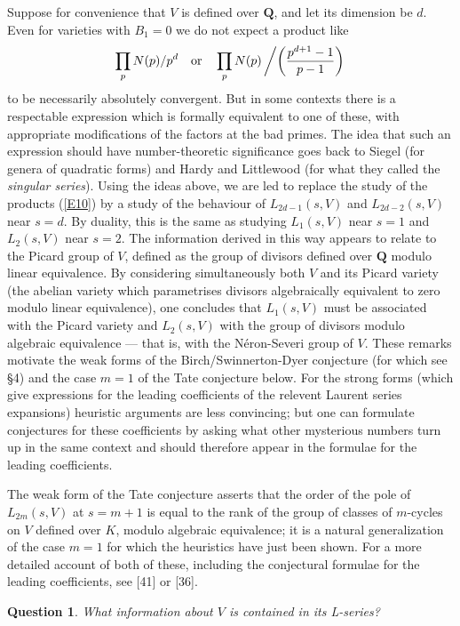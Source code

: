 \documentclass[12pt]{article}
\def\bQ{{\mathbf Q}}
\def\beq{\begin{equation} \label}
\def\bpr{\begin{question} \label}
\def\epr{\end{question}}
\newtheorem{question}{Question}
\begin{document}
Suppose for convenience that $V$ is defined over $\bQ$, and let its dimension
be $d$. Even for varieties with $B_1=0$ we do not expect a product like
\beq{E10} \prod_pN(p)/p^d \quad {\mathrm{or}} \quad
\prod_pN(p)\left/\left(\frac{p^{d+1}-1}{p-1}\right)\right. \end{equation}
to be necessarily absolutely convergent. But in some contexts there is a
respectable expression which is formally equivalent to one of these, with
appropriate modifications of the factors at the bad primes. The idea that
such an expression should have number-theoretic significance goes back to
Siegel (for genera of quadratic forms) and Hardy and Littlewood (for what they
called the \emph{singular series}). Using the ideas above, we are led to
replace the study of the products (\ref{E10}) by a study of the behaviour of
$L_{2d-1}(s,V)$ and $L_{2d-2}(s,V)$ near $s=d$. By duality, this is the same
as studying $L_1(s,V)$ near $s=1$ and $L_2(s,V)$ near $s=2$. The information
derived in this way appears to relate to the Picard group of $V$, defined as
the group of divisors defined over $\bQ$ modulo linear equivalence. By
considering simultaneously both $V$ and its Picard variety (the abelian
variety which parametrises divisors algebraically equivalent to zero modulo
linear equivalence), one concludes that $L_1(s,V)$ must be associated with
the Picard variety and $L_2(s,V)$ with the group of divisors modulo algebraic
equivalence --- that is, with the N\'{e}ron-Severi group of $V$. These remarks
motivate the weak forms of the Birch/Swinnerton-Dyer conjecture
(for which see \S4) and the case $m=1$ of
the Tate conjecture below. For the strong forms (which give
expressions for the leading coefficients of the relevent Laurent series
expansions) heuristic arguments are less convincing; but one can formulate
conjectures for these coefficients by asking what other mysterious numbers
turn up in the
same context and should therefore appear in the formulae for the leading
coefficients.

The weak form of the Tate conjecture asserts that the
order of the pole of $L_{2m}(s,V)$ at $s=m+1$ is equal to the rank of the
group of classes of $m$-cycles on $V$ defined over $K$, modulo algebraic
equivalence; it is a natural generalization of the case $m=1$ for which
the heuristics have just been shown. For a more detailed account of both of
these,
including the conjectural formulae for the leading coefficients,
see [41] or [36].
\bpr{Q7} What information about $V$ is contained in its L-series?
\epr
\end{document}
